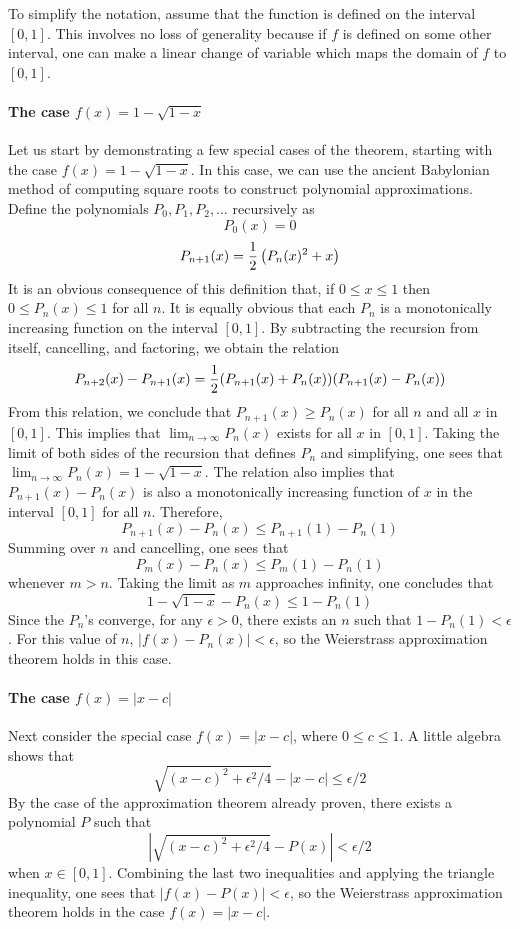 \documentclass[12pt]{article}
\begin{document}
To simplify the notation, assume that the function is defined on the interval $[0,1]$.  This involves no loss of generality because if $f$ is defined on some other interval, one can make a linear change of variable which maps the domain of $f$ to $[0,1]$.

\paragraph{The case $f(x) = 1 - \sqrt{1 - x}$}
Let us start by demonstrating a few special cases of the theorem, starting with the case $f(x) = 1 - \sqrt{1 - x}$.  In this case, we can use the ancient Babylonian method of computing square roots to construct polynomial approximations.  Define the polynomials $P_0, P_1, P_2, \ldots$ recursively as
 $$P_0 (x) = 0$$
 $$P_{n+1} (x) = {1 \over 2} \left( P_n(x)^2 + x \right)$$
It is an obvious consequence of this definition that, if $0 \le x \le 1$ then $0 \le P_n (x) \le 1$ for all $n$.  It is equally obvious that each $P_n$ is a monotonically increasing function on the interval $[0,1]$.  By subtracting the recursion from itself, cancelling, and factoring, we obtain the relation
 $$P_{n+2} (x) - P_{n+1} (x) = {1 \over 2} (P_{n+1} (x) + P_n (x)) (P_{n+1} (x) - P_n (x))$$
From this relation, we conclude that $P_{n+1} (x) \ge P_n (x)$ for all $n$ and all $x$ in $[0,1]$.  This implies that $\lim_{n \to \infty} P_n (x)$ exists for all $x$ in $[0,1]$.  Taking the limit of both sides of the recursion that defines $P_n$ and simplifying, one sees that $\lim_{n \to \infty} P_n (x) = 1 - \sqrt{1-x}$.  The relation also implies that $P_{n+1} (x) - P_n (x)$ is also a monotonically increasing function of $x$ in the interval $[0,1]$ for all $n$.  Therefore, 
 $$P_{n+1} (x) - P_n (x) \le P_{n+1} (1) - P_n (1)$$
Summing over $n$ and cancelling, one sees that
 $$P_{m} (x) - P_n (x) \le P_{m} (1) - P_n (1)$$
whenever $m > n$.  Taking the limit as $m$ approaches infinity, one concludes that
 $$1 - \sqrt{1-x} - P_n(x) \le 1 - P_n (1)$$
Since the $P_n$'s converge, for any $\epsilon > 0$, there exists an $n$ such that $1 - P_n (1) < \epsilon$.  For this value of $n$, $|f(x) - P_n (x)| < \epsilon$, so the Weierstrass approximation theorem holds in this case.

\paragraph{The case $f(x) = |x-c|$}
Next consider the special case $f(x) = |x-c|$, where $0 \le c \le 1$.  A little algebra shows that
 $$\sqrt{(x-c)^2 + \epsilon^2 / 4} - |x-c| \le \epsilon / 2$$
By the case of the approximation theorem already proven, there exists a polynomial $P$ such that
 $$|\sqrt{(x-c)^2 + \epsilon^2 / 4} - P(x)| < \epsilon / 2$$
when $x \in [0,1]$.  Combining the last two inequalities and applying the triangle inequality, one sees that $|f(x) - P(x)| < \epsilon$, so the Weierstrass approximation theorem holds in the case $f(x) = |x-c|$.
\end{document}
